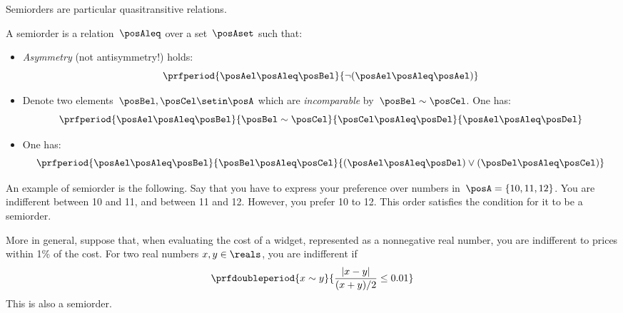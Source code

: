 Semiorders are particular quasitransitive relations. 
\begin{definition}[Semiorder]

    A semiorder is a relation~$\posAleq$ over a set~$\posAset$ such that:
            \begin{itemize}
                \item \emph{Asymmetry} (not antisymmetry!) holds:
                    \begin{equation}
                        \prfperiod{\posAel \posAleq \posBel}{\neg(\posAel \posAleq \posAel)}
                    \end{equation}
                \item Denote two elements~$\posBel, \posCel \setin \posA$ which are \emph{incomparable} by~$\posBel \sim \posCel$.
                    One has:
                    \begin{equation}
                        \prfperiod{\posAel \posAleq \posBel}{\posBel \sim \posCel}{\posCel \posAleq \posDel}{\posAel \posAleq \posDel}
                    \end{equation}
                \item One has:
                    \begin{equation}
                        \prfperiod{\posAel \posAleq \posBel}{\posBel \posAleq \posCel}{(\posAel \posAleq \posDel) \vee (\posDel \posAleq \posCel)}
                    \end{equation}
            \end{itemize}
        
\end{definition}
\begin{example}
An example of semiorder is the following.
Say that you have to express your preference over numbers in~$\posA=\{10,11,12\}$.
You are indifferent between 10 and 11, and between 11 and 12. However, you prefer 10 to 12.
This order satisfies the condition for it to be a semiorder.

More in general, suppose that, when evaluating the cost of a widget, represented as a nonnegative real number, you are indifferent to prices within 1\% of the cost.
For two real numbers $x,y\in\reals$, you are indifferent if 
\begin{equation}
    \prfdoubleperiod{
        x \sim y 
    }{
        \frac{| x - y |}{ (x+y)/2} \leq 0.01 
    }
\end{equation}
This is also a semiorder.
\end{example}

